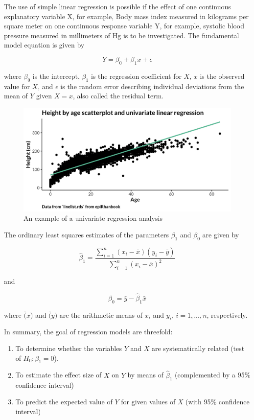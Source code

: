 \documentclass[
]{book}
\providecommand{\tightlist}{%
  \setlength{\itemsep}{0pt}\setlength{\parskip}{0pt}}
\begin{document}
The use of simple linear regression is possible if the effect of one continuous explanatory variable X, for example, Body mass index measured in kilograms per square meter on one continuous response variable Y, for example, systolic blood pressure measured in millimeters of Hg is to be investigated. The fundamental model equation is given by

\[
Y = \beta_0 + \beta_1x + \epsilon
\]

where \(\beta_0\) is the intercept, \(\beta_1\) is the regression coefficient for \(X\), \(x\) is the observed value for \(X\), and \(\epsilon\) is the random error describing individual deviations from the mean of \(Y\) given \(X=x\), also called the residual term.

\begin{figure}

{\centering \includegraphics[width=1\linewidth]{img/regression/univariate_regression} 

}

\caption{An example of a univariate regression analysis}\label{fig:unnamed-chunk-23}
\end{figure}

The ordinary least squares estimates of the parameters \(\beta_1\) and \(\beta_0\) are given by

\[
\hat{\beta}_1 = \frac{\sum_{i=1}^{n} (x_i-\bar{x})(y_i-\bar{y})}{\sum_{i=1}^{n} (x_i-\bar{x})^2}
\]

and

\[
\beta_0 = \bar{y}-\hat{\beta}_1\bar{x}
\]

where \(\bar(x)\) and \(\bar(y)\) are the arithmetic means of \(x_i\) and \(y_i\), \(i=1,...,n\), respectively.

In summary, the goal of regression models are threefold:

\begin{enumerate}
\def\labelenumi{\arabic{enumi}.}
\tightlist
\item
  To determine whether the variables \(Y\) and \(X\) are systematically related (test of \(H_0:\beta_1=0\)).
\item
  To estimate the effect size of \(X\) on \(Y\) by means of \(\hat{\beta}_1\) (complemented by a 95\% confidence interval)
\item
  To predict the expected value of \(Y\) for given values of \(X\) (with 95\% confidence interval)
\end{enumerate}
\end{document}
